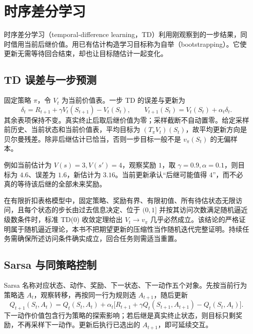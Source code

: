 \setcounter{chapter}{7} %
\chapter{时序差分学习}
\label{ch:rl-td}

时序差分学习（temporal-difference learning，TD）利用刚观察到的一步结果，同时借用当前后继价值。用已有估计构造学习目标称为自举（bootstrapping）。它使更新无需等待回合结束，却也让目标随估计一起变化。

\section{TD 误差与一步预测}

固定策略 $\pi$，令 $V_t$ 为当前价值表。一步 TD 的误差与更新为
\begin{equation}
\delta_t=R_{t+1}+\gamma V_t(S_{t+1})-V_t(S_t),\qquad
V_{t+1}(S_t)=V_t(S_t)+\alpha_t\delta_t.
\label{eq:rl-td-zero}
\end{equation}
其余表项保持不变。真实终止后取后继价值为零；采样截断不自动置零。给定采样前历史、当前状态和当前价值表，平均目标为 $(T_\pi V_t)(S_t)$，故平均更新方向是贝尔曼残差。除非后继估计已恰当，否则一步目标一般不是 $v_\pi(S_t)$ 的无偏样本。

例如当前估计为 $V(s)=3,V(s')=4$，观察奖励 $1$，取 $\gamma=0.9,\alpha=0.1$，则目标为 $4.6$、误差为 $1.6$，新估计为 $3.16$。当前更新承认“后继可能值得 $4$”，而不必真的等待该后继的全部未来奖励。

在有限折扣表格模型中，固定策略、奖励有界、有限初值、所有待估状态无限访问，且每个状态的步长由过去信息决定、位于 $(0,1]$ 并按其访问次数满足随机逼近级数条件时，标准 TD(0) 收敛定理给出 $V_t\to v_\pi$ 几乎必然成立\cite{sutton-barto}。该结论的严格证明属于随机逼近理论，本书不把期望更新的压缩性当作随机迭代完整证明。持续任务需确保所述访问条件确实成立，回合任务则需适当重置。

\section{Sarsa 与同策略控制}

Sarsa 名称对应状态、动作、奖励、下一状态、下一动作五个对象。先按当前行为策略选 $A_t$，观察转移，再按同一行为规则选 $A_{t+1}$，随后更新
\[
Q_{t+1}(S_t,A_t)=Q_t(S_t,A_t)+\alpha_t
\bigl[R_{t+1}+\gamma Q_t(S_{t+1},A_{t+1})-Q_t(S_t,A_t)\bigr].
\]
下一动作价值包含行为策略的探索影响；若后继是真实终止状态，则目标只剩奖励，不再采样下一动作。更新后执行已选出的 $A_{t+1}$，即可延续交互。

